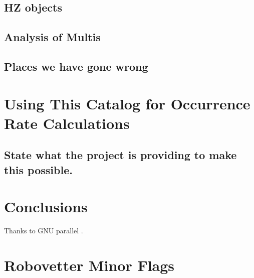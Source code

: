 \documentclass[apj,twocolappendix,numberedappendix]{emulateapj}
\renewcommand{\_}{\discretionary{\underscore}{}{\underscore}}  %
\begin{document}
\subsection{HZ objects}
\subsection{Analysis of Multis}
\subsection{Places we have gone wrong}

\section{Using This Catalog for Occurrence Rate Calculations}
\subsection{State what the project is providing to make this possible.}


\section{Conclusions}

\acknowledgments
Thanks to GNU parallel \citep{Tange2011a}.


\section{Robovetter Minor Flags}
%


\end{document}
